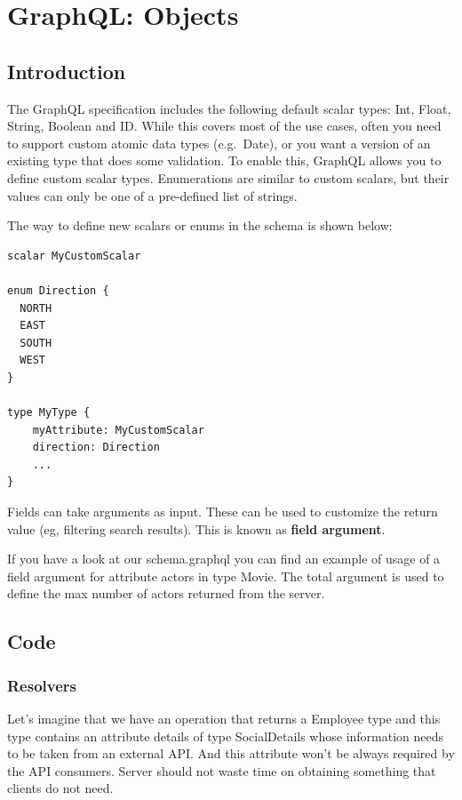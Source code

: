 \documentclass[]{book}
\begin{document}
\chapter{GraphQL: Objects}\label{graphql-objects}

\section{Introduction}\label{introduction-1}

The GraphQL specification includes the following default scalar types:
Int, Float, String, Boolean and ID. While this covers most of the use
cases, often you need to support custom atomic data types (e.g.~Date),
or you want a version of an existing type that does some validation. To
enable this, GraphQL allows you to define custom scalar types.
Enumerations are similar to custom scalars, but their values can only be
one of a pre-defined list of strings.

The way to define new scalars or enums in the schema is shown below:

\begin{verbatim}
scalar MyCustomScalar

enum Direction {
  NORTH
  EAST
  SOUTH
  WEST
}

type MyType {
    myAttribute: MyCustomScalar
    direction: Direction
    ...
}
\end{verbatim}

Fields can take arguments as input. These can be used to customize the
return value (eg, filtering search results). This is known as
\textbf{field argument}.

If you have a look at our schema.graphql you can find an example of
usage of a field argument for attribute actors in type Movie. The total
argument is used to define the max number of actors returned from the
server.

\section{Code}\label{code}

\subsection{Resolvers}\label{resolvers}

Let's imagine that we have an operation that returns a Employee type and
this type contains an attribute details of type SocialDetails whose
information needs to be taken from an external API. And this attribute
won't be always required by the API consumers. Server should not waste
time on obtaining something that clients do not need.
\end{document}

